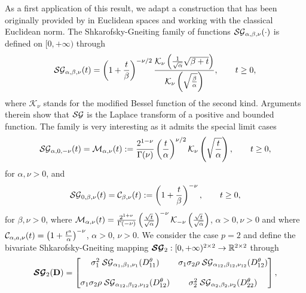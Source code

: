 \documentclass[12pt]{article}
\theoremstyle{plain}
\theoremstyle{remark}
\newcommand{\R}[0]{\mathbb{R}}
\newcommand{\latMatr}[1]{\mathbf{#1}}          %
\begin{document}
    As a  {first} application of this result, we adapt a construction that has been originally provided by \cite{porcu2018shkarofsky} in Euclidean spaces and working with the classical Euclidean norm. The {Shkarofsky-Gneiting} family of functions ${\cal SG}_ {\alpha, \beta, \nu}(\cdot) $ is defined on $[0,+\infty)$ through 
    \begin{equation}
        \label{eq:gen_hyper_cov}
        {\cal SG}_ {\alpha, \beta, \nu}(t) = \left  ( 1+ \frac{t}{\beta } \right )^{- \nu/2} \frac{\mathcal{K}_{\nu} \left ( \frac{1}{\sqrt{\alpha}} \sqrt{\beta + t}\right ) }{\mathcal{K}_{\nu} \left ( \sqrt{\frac{\beta}{\alpha}}\right )}, \qquad t \ge 0,
    \end{equation}
    where $\mathcal{K}_{\nu}$ stands for the modified Bessel function of the second kind. 
    Arguments therein show that ${\cal SG}$ is the Laplace transform of a positive and bounded function. The family is very interesting as it admits the special limit cases
    \begin{equation*}
        \label{eq:matern_cov}
        {\cal SG}_ {\alpha, 0, -\nu}(t) = {\cal M}_{\alpha,\nu}(t):= \frac{2^{1-\nu}}{\Gamma(\nu)} \left ( {\frac{t}{\alpha}} \right )^{\nu/2} \mathcal{K}_{\nu} \left ( \sqrt{\frac{t}{\alpha}} \right ), \qquad t \ge 0, 
    \end{equation*}
    for $\alpha, \nu>0$, and 
    \begin{equation*}
        \label{eq:cauchy_cov} 
        {\cal SG}_ {0, \beta, \nu}(t) = {\cal C}_{\beta,\nu}(t):= \left ( 1+ \frac{t}{\beta} \right )^{-\nu}, \qquad t \ge 0, 
    \end{equation*}
    for $\beta, \nu >0$, where ${\cal M}_{\alpha,\nu}(t) = \frac{2^{1+\nu}}{\Gamma(-\nu)} \left ( \frac{\sqrt{t}}{\sqrt{\alpha}} \right )^{-\nu} \mathcal{K}_{-\nu} \left ( \frac{\sqrt{t}}{\sqrt{\alpha}} \right )$, $\alpha>0, \nu>0$ and where ${\cal C}_{\alpha,a, \nu}(t)=\left ( 1+ \frac{t^a}{\alpha} \right )^{-\nu}$, $\alpha>0$, $\nu>0$.
    We {consider the case $p=2$ and} define the bivariate Shkarofsky-Gneiting mapping $\boldsymbol{{\cal SG}}_2 : [0,+\infty)^{{2 \times 2}} \to \R^{2 \times 2}$ through 
    \begin{equation}
        \label{eq:elpatron_model} 
        \boldsymbol{{\cal SG}}_2  (\latMatr{D}) = \begin{bmatrix} 
            \sigma_1^2 \;{\cal SG}_{\alpha_{1},\beta_{1},\nu_{1}}({{D}_{11}^{\theta}}) & \sigma_1 \sigma_2 \rho  \;{\cal SG}_{\alpha_{12},\beta_{12},\nu_{12}}({{D}_{12}^{\theta}}) \\
            & \\
            \sigma_1 \sigma_2 {\rho} \;{\cal SG}_{\alpha_{12},\beta_{12},\nu_{12}}({{D}_{12}^{\theta}}) & \sigma_2^2 \;{\cal SG}_{\alpha_{2},\beta_{2},\nu_{2}}({{D}_{22}^{\theta}})
        \end{bmatrix}, 
    \end{equation}
\end{document}
